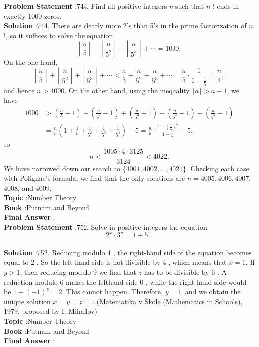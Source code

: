 \documentclass[10pt]{article}
\begin{document}
\textbf{Problem Statement} :744. Find all positive integers $n$ such that $n$ ! ends in exactly 1000 zeros.\\
\textbf{Solution} :744. There are clearly more 2's than 5's in the prime factorization of $n$ !, so it suffices to solve the equation$$ \left\lfloor\frac{n}{5}\right\rfloor+\left\lfloor\frac{n}{5^{2}}\right\rfloor+\left\lfloor\frac{n}{5^{3}}\right\rfloor+\cdots=1000 . $$On the one hand,$$ \left\lfloor\frac{n}{5}\right\rfloor+\left\lfloor\frac{n}{5^{2}}\right\rfloor+\left\lfloor\frac{n}{5^{3}}\right\rfloor+\cdots<\frac{n}{5}+\frac{n}{5^{2}}+\frac{n}{5^{3}}+\cdots=\frac{n}{5} \cdot \frac{1}{1-\frac{1}{5}}=\frac{n}{4}, $$and hence $n>4000$. On the other hand, using the inequality $\lfloor a\rfloor>a-1$, we have$$ \begin{aligned} 1000 &>\left(\frac{n}{5}-1\right)+\left(\frac{n}{5^{2}}-1\right)+\left(\frac{n}{5^{3}}-1\right)+\left(\frac{n}{5^{4}}-1\right)+\left(\frac{n}{5^{5}}-1\right) \\ &=\frac{n}{5}\left(1+\frac{1}{5}+\frac{1}{5^{2}}+\frac{1}{5^{3}}+\frac{1}{5^{4}}\right)-5=\frac{n}{5} \cdot \frac{1-\left(\frac{1}{5}\right)^{5}}{1-\frac{1}{5}}-5, \end{aligned} $$so$$ n<\frac{1005 \cdot 4 \cdot 3125}{3124}<4022 . $$We have narrowed down our search to $\{4001,4002, \ldots, 4021\}$. Checking each case with Polignac's formula, we find that the only solutions are $n=4005,4006,4007$, 4008, and 4009.\\
\textbf{Topic} :Number Theory\\
\textbf{Book} :Putnam and Beyond\\
\textbf{Final Answer} :\\


\textbf{Problem Statement} :752. Solve in positive integers the equation$$ 2^{x} \cdot 3^{y}=1+5^{z} . $$\\
\textbf{Solution} :752. Reducing modulo 4 , the right-hand side of the equation becomes equal to 2 . So the left-hand side is not divisible by 4 , which means that $x=1$. If $y>1$, then reducing modulo 9 we find that $z$ has to be divisible by 6 . A reduction modulo 6 makes the lefthand side 0 , while the right-hand side would be $1+(-1)^{z}=2$. This cannot happen. Therefore, $y=1$, and we obtain the unique solution $x=y=z=1$.(Matematika v Škole (Mathematics in Schools), 1979, proposed by I. Mihailov)\\
\textbf{Topic} :Number Theory\\
\textbf{Book} :Putnam and Beyond\\
\textbf{Final Answer} :\\
\end{document}
